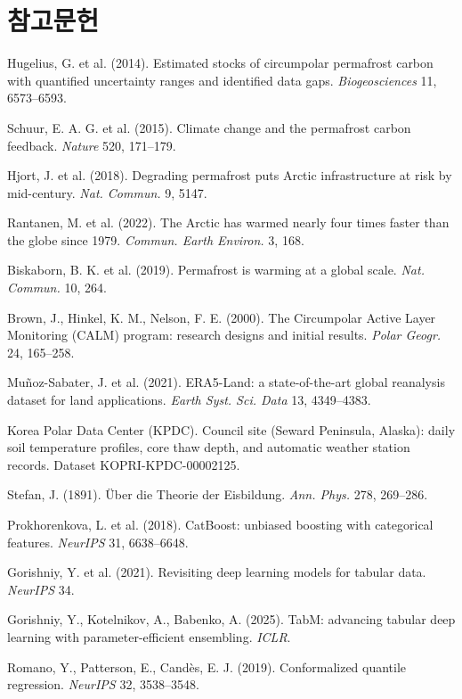 \documentclass[10pt,twocolumn]{article}
\begin{document}
\section*{참고문헌}
{\footnotesize
\begin{enumerate}[leftmargin=1.5em,itemsep=0pt,topsep=0pt,parsep=0pt,label={[\arabic*]}]
\item Hugelius, G. et al. (2014). Estimated stocks of circumpolar permafrost carbon with quantified uncertainty ranges and identified data gaps. \textit{Biogeosciences} 11, 6573--6593.
\item Schuur, E. A. G. et al. (2015). Climate change and the permafrost carbon feedback. \textit{Nature} 520, 171--179.
\item Hjort, J. et al. (2018). Degrading permafrost puts Arctic infrastructure at risk by mid-century. \textit{Nat. Commun.} 9, 5147.
\item Rantanen, M. et al. (2022). The Arctic has warmed nearly four times faster than the globe since 1979. \textit{Commun. Earth Environ.} 3, 168.
\item Biskaborn, B. K. et al. (2019). Permafrost is warming at a global scale. \textit{Nat. Commun.} 10, 264.
\item Brown, J., Hinkel, K. M., Nelson, F. E. (2000). The Circumpolar Active Layer Monitoring (CALM) program: research designs and initial results. \textit{Polar Geogr.} 24, 165--258.
\item Mu\~noz-Sabater, J. et al. (2021). ERA5-Land: a state-of-the-art global reanalysis dataset for land applications. \textit{Earth Syst. Sci. Data} 13, 4349--4383.
\item Korea Polar Data Center (KPDC). Council site (Seward Peninsula, Alaska): daily soil temperature profiles, core thaw depth, and automatic weather station records. Dataset KOPRI-KPDC-00002125.
\item Stefan, J. (1891). \"Uber die Theorie der Eisbildung. \textit{Ann. Phys.} 278, 269--286.
\item Prokhorenkova, L. et al. (2018). CatBoost: unbiased boosting with categorical features. \textit{NeurIPS} 31, 6638--6648.
\item Gorishniy, Y. et al. (2021). Revisiting deep learning models for tabular data. \textit{NeurIPS} 34.
\item Gorishniy, Y., Kotelnikov, A., Babenko, A. (2025). TabM: advancing tabular deep learning with parameter-efficient ensembling. \textit{ICLR}.
\item Romano, Y., Patterson, E., Cand\`es, E. J. (2019). Conformalized quantile regression. \textit{NeurIPS} 32, 3538--3548.

\end{enumerate}}
\end{document}
